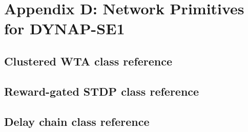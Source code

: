 \chapter{Appendix D: Network Primitives for DYNAP-SE1}
 \label{appendix:bias_tuning_tools}

 \section{Clustered WTA class reference}

 \section{Reward-gated STDP class reference}

 \section{Delay chain class reference}
